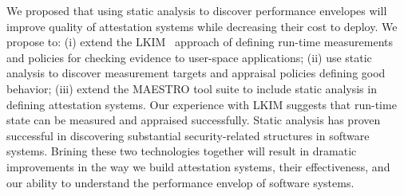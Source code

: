 \documentclass[runningheads]{llncs}
\begin{document}
We proposed that using static analysis to discover performance envelopes will
improve quality of attestation systems while decreasing their cost to deploy. We
propose to: (i) extend the LKIM~\citep{Loscocco:07:Linux-kernel-in} approach of
defining run-time measurements and policies for checking evidence to user-space
applications; (ii) use static analysis to discover measurement
targets and appraisal policies defining good behavior; (iii) extend the MAESTRO
tool suite to include static analysis in defining attestation systems. Our
experience with LKIM suggests that run-time state can be measured and appraised
successfully.  Static analysis has proven successful in discovering substantial
security-related structures in software
systems.  Brining these two technologies together will result in dramatic
improvements in the way we build attestation systems, their effectiveness, and
our ability to understand the performance envelop of software systems.

% 
% 
%
%
%


%
\end{document}
